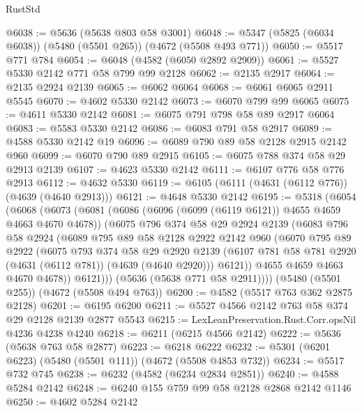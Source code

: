 \begin{lexlean}{RustStd}
\begin{coremodule}
@6038 := @5636 (@5638 @803 @58 @3001)
@6048 := @5347 (@5825 (@6034 @6038)) (@5480 (@5501 @265)) (@4672 (@5508 @493 @771))
@6050 := @5517 @771 @784
@6054 := @6048 (@4582 (@6050 @2892 @2909))
@6061 := @5527 @5330 @2142 @771 @58 @799 @99 @2128
@6062 := @2135 @2917
@6064 := @2135 @2924 @2139
@6065 := @6062 @6064
@6068 := @6061 @6065 @2911 @5545
@6070 := @4602 @5330 @2142
@6073 := @6070 @799 @99 @6065
@6075 := @4611 @5330 @2142
@6081 := @6075 @791 @798 @58 @89 @2917 @6064
@6083 := @5583 @5330 @2142
@6086 := @6083 @791 @58 @2917
@6089 := @4588 @5330 @2142 @19
@6096 := @6089 @790 @89 @58 @2128 @2915 @2142 @960
@6099 := @6070 @790 @89 @2915
@6105 := @6075 @788 @374 @58 @29 @2913 @2139
@6107 := @4623 @5330 @2142
@6111 := @6107 @776 @58 @776 @2913
@6112 := @4632 @5330
@6119 := @6105 (@6111 (@4631 (@6112 @776)) (@4639 (@4640 @2913)))
@6121 := @4648 @5330 @2142
@6195 := @5318
    (@6054
      (@6068
        (@6073
          (@6081
            (@6086 (@6096 (@6099 (@6119 @6121)) @4655 @4659 @4663 @4670 @4678))
            (@6075
              @796
              @374
              @58
              @29
              @2924
              @2139
              (@6083
                @796
                @58
                @2924
                (@6089
                  @795
                  @89
                  @58
                  @2128
                  @2922
                  @2142
                  @960
                  (@6070
                    @795
                    @89
                    @2922
                    (@6075
                      @793
                      @374
                      @58
                      @29
                      @2920
                      @2139
                      (@6107 @781 @58 @781 @2920 (@4631 (@6112 @781)) (@4639 (@4640 @2920)))
                      @6121))
                  @4655
                  @4659
                  @4663
                  @4670
                  @4678))
              @6121)))
        (@5636 (@5638 @771 @58 @2911))))
    (@5480 (@5501 @255))
    (@4672 (@5508 @494 @763))
@6200 := @4582 (@5517 @763 @362 @2875 @2128)
@6201 := @6195 @6200
@6211 := @5527 @4566 @2142 @763 @58 @374 @29 @2128 @2139 @2877 @5543
@6215 := LexLeanPreservation.Rust.Corr.opsNil @4236 @4238 @4240
@6218 := @6211 (@6215 @4566 @2142)
@6222 := @5636 (@5638 @763 @58 @2877)
@6223 := @6218 @6222
@6232 := @5301 (@6201 @6223) (@5480 (@5501 @111)) (@4672 (@5508 @4853 @732))
@6234 := @5517 @732 @745
@6238 := @6232 (@4582 (@6234 @2834 @2851))
@6240 := @4588 @5284 @2142
@6248 := @6240 @155 @759 @99 @58 @2128 @2868 @2142 @1146
@6250 := @4602 @5284 @2142

\end{coremodule}
\end{lexlean}
